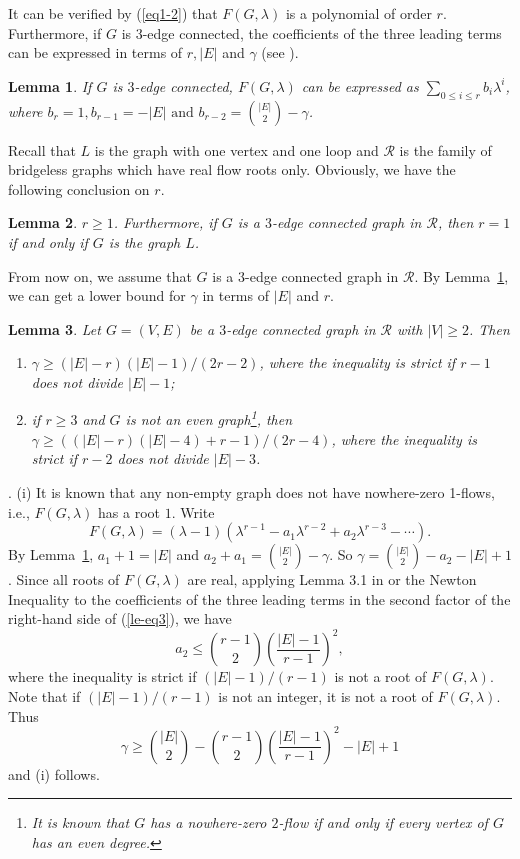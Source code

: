 \documentclass[11pt]{article}
\newtheorem{lem}{Lemma}
\newcommand {\red} {\textcolor{red}}
\newcommand{\proof}
{{\noindent {\em Proof}.\quad}\setcounter{countclaim}{0}
\setcounter{countcase}{0}}
\newcounter{countclaim}
\newcounter{countcase}
\def \setgr {\mathscr{R}}
\newcommand{\beeq}{\begin{equation}}
\newcommand{\eneq}{\end{equation}}
\newcommand {\relabel}[1] {\label{#1} \red{[*: #1]}}\newcommand {\rebibitem}[1] {\bibitem{#1} \red{[*: #1]}}%
\def\relabel {\label} \def\rebibitem {\bibitem}  %
\begin{document}
It can be verified by (\ref{eq1-2}) that 
$F(G,\lambda)$ is a polynomial of order $r$.
Furthermore, if $G$ is $3$-edge connected, 
the coefficients of the three leading terms 
can be expressed in terms of $r, |E|$ and $\gamma$ 
(see \cite{kung}). 

\begin{lem}\relabel{le00}
If $G$ is $3$-edge connected, 
$F(G,\lambda)$ can be expressed as  
$\sum\limits_{0\le i\le r}b_i\lambda^i$, 
where $b_r=1, b_{r-1}=-|E|\mbox{ and }b_{r-2}={|E|\choose 2}-\gamma$.
\end{lem}
  
Recall that $L$ is the graph with one vertex 
and one loop and $\setgr$ is the family of  bridgeless 
graphs which have real flow roots only.
Obviously, we have the following conclusion on $r$. 

\begin{lem}
\relabel{le0}
$r\ge 1$.
Furthermore,  
if $G$ is a $3$-edge connected graph in $\setgr$, then 
$r=1$ if and only if $G$ is the graph $L$.
\end{lem}



From now on, we assume that $G$ is a $3$-edge connected 
graph in $\setgr$.  
By Lemma~\ref{le00}, 
we can get a lower bound for $\gamma$ 
in terms of $|E|$ and $r$. 


\begin{lem}
 \relabel{le1}
Let $G=(V,E)$ be a $3$-edge connected graph in $\setgr$
with $|V|\ge 2$. 
Then
\begin{enumerate}
\item 
$\gamma\ge (|E|-r)(|E|-1)/(2r-2)$,
where the inequality is strict if $r-1$ does not divide $|E|-1$;

\item if $r\ge 3$ and $G$ is not an even graph\footnote{It is 
known that 
$G$ has a nowhere-zero $2$-flow if and only if every
vertex of $G$ has an even degree.}, then 
$\gamma\ge ((|E|-r)(|E|-4)+r-1)/(2r-4)$,
where the inequality is strict if $r-2$ does not divide $|E|-3$.
\end{enumerate}
\end{lem}

\proof  (i) 
It is known that any non-empty graph 
does not have nowhere-zero 1-flows, i.e., 
$F(G,\lambda)$ has a root $1$. 
Write 
\beeq\relabel{le-eq3}
F(G,\lambda)
=(\lambda -1)(\lambda^{r-1}-a_1\lambda^{r-2}
+a_2\lambda^{r-3}-\cdots).
\eneq
By Lemma~\ref{le00}, 
$a_1+1=|E|$ and $a_2+a_1={|E|\choose 2}-\gamma$.
So $\gamma={|E|\choose 2}-a_2-|E|+1$.
Since all roots of $F(G,\lambda)$ are real, 
applying Lemma 3.1 in \cite{kung} or 
the Newton Inequality \cite{har1978} to the coefficients of 
the three leading terms in the second factor of 
the right-hand side of (\ref{le-eq3}), 
we have 
\beeq\relabel{le-eq6}
a_2
\le {r-1\choose 2} 
\left (\frac{|E|-1}{r-1}\right )^2,
\eneq
where the inequality is strict if
$(|E|-1)/(r-1)$ is not a root of $F(G,\lambda)$.
Note that if $(|E|-1)/(r-1)$ is not an integer, 
it is not a root of $F(G,\lambda)$.
Thus 
$$
\gamma\ge {|E|\choose 2}-{r-1\choose 2} 
\left (\frac{|E|-1}{r-1}\right )^2-|E|+1
$$
and (i) follows.
\end{document}
